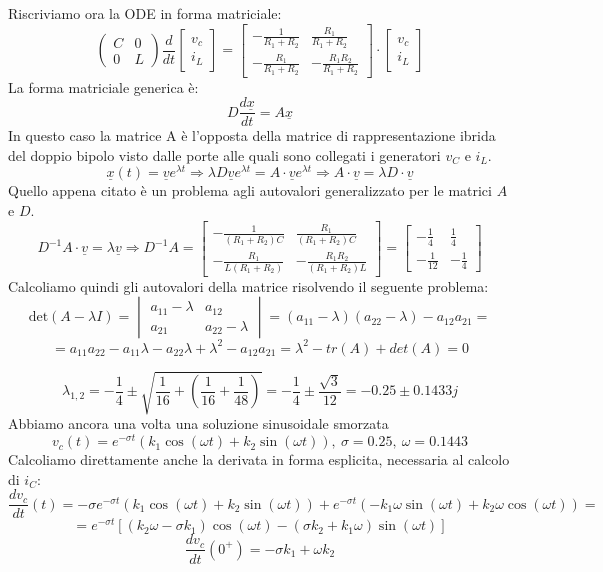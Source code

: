 Riscriviamo ora la ODE in forma matriciale:
$$
\begin{pmatrix}
 C & 0 \\
 0 & L
\end{pmatrix}
\frac{d}{dt}
\begin{bmatrix}
v_c \\
i_L
\end{bmatrix}
=
\begin{bmatrix}
-\frac{1}{R_1+R_2} & \frac{R_1}{R_1+R_2}\\
-\frac{R_1}{R_1+R_2} & -\frac{R_1R_2}{R_1+R_2}
\end{bmatrix}\cdot
\begin{bmatrix}
v_c \\
i_L
\end{bmatrix}
$$
La forma matriciale generica è:
$$
D\frac{d\underline{x}}{dt} = A\underline{x}
$$
In questo caso la matrice A è l'opposta della matrice di rappresentazione ibrida del doppio bipolo visto 
dalle porte alle quali sono collegati i generatori $v_C$ e $i_L$.
$$
\underline{x}(t) = \underline{v}e^{\lambda t} \Rightarrow \lambda D \underline{v} e ^{\lambda t} = A\cdot \underline{v}e^{\lambda t} \Rightarrow A\cdot \underline{v} = \lambda D\cdot\underline{v}
$$
Quello appena citato è un problema agli autovalori generalizzato per le matrici $A$ e $D$.
$$
D^{-1}A\cdot\underline{v} = \lambda\underline{v} \Rightarrow D^{-1}A = 
\begin{bmatrix}
-\frac{1}{(R_1+R_2)C} & \frac{R_1}{(R_1+R_2)C} \\
-\frac{R_1}{L(R_1+R_2)} & -\frac{R_1R_2}{(R_1+R_2)L}
\end{bmatrix}
=
\begin{bmatrix}
-\frac{1}{4} & \frac{1}{4} \\
-\frac{1}{12} & -\frac{1}{4}
\end{bmatrix}
$$
Calcoliamo quindi gli autovalori della matrice risolvendo il seguente problema:
$$
\text{det}\left(A-\lambda I\right) = 
\begin{vmatrix}
a_{11}-\lambda & a_{12}\\
a_{21} & a_{22}-\lambda
\end{vmatrix}
= (a_{11}-\lambda)(a_{22}-\lambda) -a_{12}a_{21} =
$$
$$
= a_{11}a_{22} - a_{11}\lambda - a_{22}\lambda + \lambda^2 - a_{12}a_{21} = \lambda^2 - tr(A) + det(A) =0
$$

$$
\lambda_{1,2} = -\frac{1}{4} \pm \sqrt{\frac{1}{16}+\left(\frac{1}{16}+\frac{1}{48}\right)} = -\frac{1}{4}\pm \frac{\sqrt{3}}{12} = - 0.25 \pm 0.1433j
$$
Abbiamo ancora una volta una soluzione sinusoidale smorzata
$$
v_c(t) = e^{-\sigma t}\left(k_1\cos(\omega t) + k_2\sin(\omega t)\right),\ \sigma = 0.25,\ \omega = 0.1443
$$
Calcoliamo direttamente anche la derivata in forma esplicita, necessaria al calcolo di $i_C$:
$$
\frac{dv_c}{dt}(t) = -\sigma e^{-\sigma t}\left(k_1\cos(\omega t)+k_2\sin(\omega t)\right) + e^{-\sigma t}(-k_1\omega \sin(\omega t) + k_2 \omega \cos(\omega t)) =
$$
$$
=e^{-\sigma t} \left[(k_2\omega -\sigma k_1)\cos(\omega t) - (\sigma k_2 + k_1\omega ) \sin(\omega t) \right]
$$
\begin{equation}
\frac{dv_c}{dt}(0^+)= -\sigma k_1 + \omega k_2
\label{eq:dvc_esercizio2}
\end{equation}

